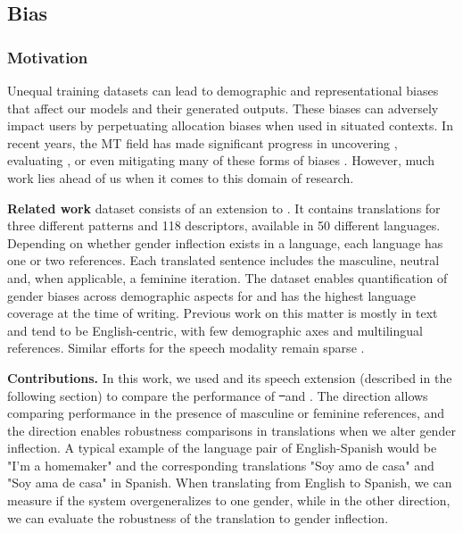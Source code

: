 \subsection{Bias}
\label{apx:holisticbias}


\subsubsection{Motivation}

Unequal training datasets can lead to demographic and representational biases that affect our models and their generated outputs. These biases can adversely impact users by perpetuating allocation biases when used in situated contexts. In recent years, the MT field has made significant progress in uncovering \citep{prates:2020}, evaluating \citep{stanovsky-etal-2019-evaluating,renduchintala-etal-2021-gender, costa-jussa-etal-2022-evaluating,bentivogli-etal-2020-gender}, or even mitigating many of these forms of biases \citep{renduchintala-williams-2022-investigating}. However, much work lies ahead of us when it comes to this domain of research. 










\textbf{Related work}  \multilingualholisticbias dataset \citep{costa2023multilingual} consists of an extension to \holisticbias. It contains translations for three different patterns and 118 descriptors, available in 50 different languages. Depending on whether gender inflection exists in a language, each language has one or two references. Each translated sentence includes the masculine, neutral and, when applicable, a feminine iteration.
The dataset enables quantification of gender biases across demographic aspects for \mt and has the highest language coverage at the time of writing. Previous work on this matter is mostly in text \citep{stanovsky-etal-2019-evaluating,renduchintala-etal-2021-gender,levy-etal-2021-collecting-large,costajussaetal:2022,renduchintala-williams-2022-investigating} and tend to be English-centric, with few demographic axes and multilingual references. Similar efforts for the speech modality remain sparse \citep{costa-jussa-etal-2022-evaluating, bentivogli-etal-2020-gender}.

\textbf{Contributions.} In this work, we used \multilingualholisticbias and its speech extension (described in the following section) to compare the performance of \st\ and \sst. The \engx direction allows comparing performance in the presence of masculine or feminine references, and the \xeng direction enables robustness comparisons in translations when we alter gender inflection. A typical example of the language pair of English-Spanish would be "I'm a homemaker" and the corresponding translations "Soy amo de casa" and "Soy ama de casa" in Spanish. When translating from English to Spanish, we can measure if the system overgeneralizes to one gender, while in the other direction, we can evaluate the robustness of the translation to gender inflection.

